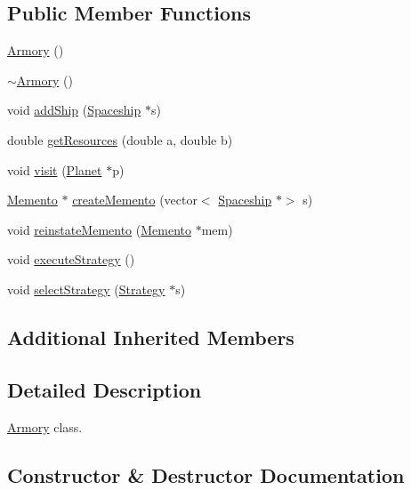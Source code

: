 \subsection*{Public Member Functions}
\begin{DoxyCompactItemize}
\item 
\hyperlink{classArmory_ad1d556c807fe5f3e5852cfbb818c4f1c}{Armory} ()
\item 
\hyperlink{classArmory_a4af8efb475734ef6292e5cdef489c9d9}{$\sim$\+Armory} ()
\item 
void \hyperlink{classArmory_adccb51a0901294546bfb1da350ae6836}{add\+Ship} (\hyperlink{classSpaceship}{Spaceship} $\ast$s)
\item 
double \hyperlink{classArmory_a06bba21799ef0b2a9f835632411420a4}{get\+Resources} (double a, double b)
\item 
void \hyperlink{classArmory_a76e105e23137e82f67e752ff13f52d75}{visit} (\hyperlink{classPlanet}{Planet} $\ast$p)
\item 
\hyperlink{classMemento}{Memento} $\ast$ \hyperlink{classArmory_aba8aa540182986fbb0ca8a741f491ffe}{create\+Memento} (vector$<$ \hyperlink{classSpaceship}{Spaceship} $\ast$$>$ s)
\item 
void \hyperlink{classArmory_ad4027c724be016da41eeac5aaab2238b}{reinstate\+Memento} (\hyperlink{classMemento}{Memento} $\ast$mem)
\item 
void \hyperlink{classArmory_aab75c86069fac4995a56c6318a33e504}{execute\+Strategy} ()
\item 
void \hyperlink{classArmory_a85d472873bf4ce934c849f7c362f7064}{select\+Strategy} (\hyperlink{classStrategy}{Strategy} $\ast$s)
\end{DoxyCompactItemize}
\subsection*{Additional Inherited Members}


\subsection{Detailed Description}
\hyperlink{classArmory}{Armory} class. 

\subsection{Constructor \& Destructor Documentation}
\mbox{\label{classArmory_ad1d556c807fe5f3e5852cfbb818c4f1c}} 
